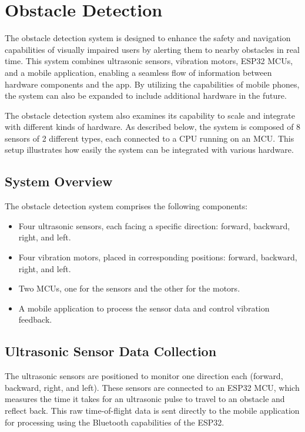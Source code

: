 \section{Obstacle Detection}
\label{Obstacle Detection Methodology Section}

The obstacle detection system is designed to enhance the safety and navigation capabilities of visually impaired users by alerting them to nearby obstacles in real time. This system combines ultrasonic sensors, vibration motors, ESP32 MCUs, and a mobile application, enabling a seamless flow of information between hardware components and the app. By utilizing the capabilities of mobile phones, the system can also be expanded to include additional hardware in the future.

The obstacle detection system also examines its capability to scale and integrate with different kinds of hardware. As described below, the system is composed of 8 sensors of 2 different types, each connected to a CPU running on an MCU. This setup illustrates how easily the system can be integrated with various hardware.

\subsection{System Overview}

The obstacle detection system comprises the following components:

\begin{itemize}
	\item Four ultrasonic sensors, each facing a specific direction: forward, backward, right, and left.
	\item Four vibration motors, placed in corresponding positions: forward, backward, right, and left.
	\item Two MCUs, one for the sensors and the other for the motors.
	\item A mobile application to process the sensor data and control vibration feedback.
\end{itemize}

\subsection{Ultrasonic Sensor Data Collection}

The ultrasonic sensors are positioned to monitor one direction each (forward, backward, right, and left). These sensors are connected to an ESP32 MCU, which measures the time it takes for an ultrasonic pulse to travel to an obstacle and reflect back. This raw time-of-flight data is sent directly to the mobile application for processing using the Bluetooth capabilities of the ESP32.

